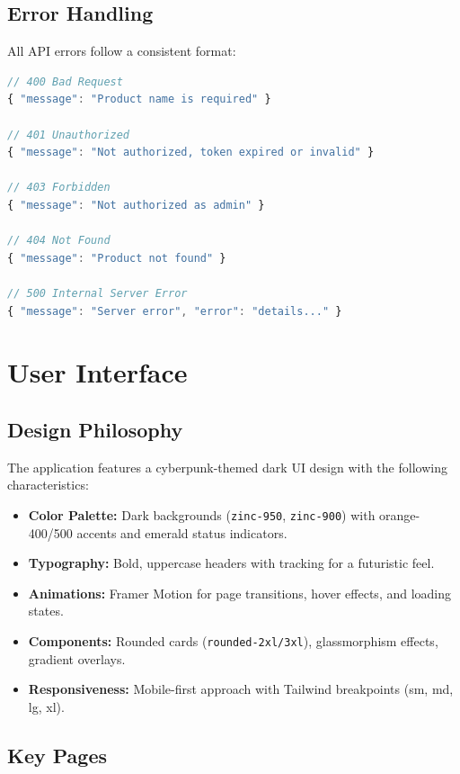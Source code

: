 \documentclass[12pt,a4paper]{report}
\begin{document}
\section{Error Handling}
All API errors follow a consistent format:
\begin{lstlisting}[language=JavaScript, caption={API Error Response Format}]
// 400 Bad Request
{ "message": "Product name is required" }

// 401 Unauthorized
{ "message": "Not authorized, token expired or invalid" }

// 403 Forbidden
{ "message": "Not authorized as admin" }

// 404 Not Found
{ "message": "Product not found" }

// 500 Internal Server Error
{ "message": "Server error", "error": "details..." }
\end{lstlisting}


\chapter{User Interface}

\section{Design Philosophy}
The application features a cyberpunk-themed dark UI design with the following characteristics:
\begin{itemize}[noitemsep]
  \item \textbf{Color Palette:} Dark backgrounds (\texttt{zinc-950}, \texttt{zinc-900}) with orange-400/500 accents and emerald status indicators.
  \item \textbf{Typography:} Bold, uppercase headers with tracking for a futuristic feel.
  \item \textbf{Animations:} Framer Motion for page transitions, hover effects, and loading states.
  \item \textbf{Components:} Rounded cards (\texttt{rounded-2xl/3xl}), glassmorphism effects, gradient overlays.
  \item \textbf{Responsiveness:} Mobile-first approach with Tailwind breakpoints (sm, md, lg, xl).
\end{itemize}

\section{Key Pages}
\end{document}
